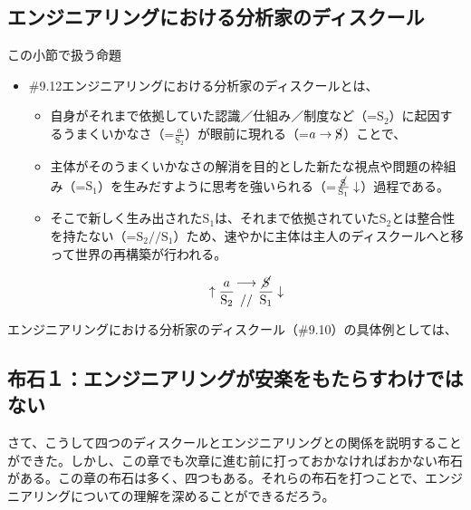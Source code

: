 \subsection{エンジニアリングにおける分析家のディスクール}\label{ux30a8ux30f3ux30b8ux30cbux30a2ux30eaux30f3ux30b0ux306bux304aux3051ux308bux5206ux6790ux5bb6ux306eux30c7ux30a3ux30b9ux30afux30fcux30eb}

\begin{note}{}{この小節で扱う命題}
  \begin{itemize}
    \tightlist
    \item{\#9.12}エンジニアリングにおける分析家のディスクールとは、
      \begin{itemize}
        \tightlist
        \item 自身がそれまで依拠していた認識／仕組み／制度など（=$\textrm{S}_2$）に起因するうまくいかなさ（=$\frac{a}{\textrm{S}_2}$）が眼前に現れる（=$a\rightarrow\cancel{\textrm{S}}$）ことで、
        \item 主体がそのうまくいかなさの解消を目的とした新たな視点や問題の枠組み（=$\textrm{S}_1$）を生みだすように思考を強いられる（=$\frac{\cancel{\textrm{S}}}{\textrm{S}_1}\downarrow$）過程である。
        \item そこで新しく生み出された$\textrm{S}_1$は、それまで依拠されていた$\textrm{S}_2$とは整合性を持たない（=$\textrm{S}_2//\textrm{S}_1$）ため、速やかに主体は主人のディスクールへと移って世界の再構築が行われる。
      \end{itemize}

$$
\uparrow\frac{a}{\mathrm{S_2}}\genfrac{}{}{0pt}{}{\longrightarrow}{//}\frac{\mathrm{\cancel{S}}}{\mathrm{S_1}}\downarrow
$$
  \end{itemize}
\end{note}

エンジニアリングにおける分析家のディスクール（\#9.10）の具体例としては、

\subsection{布石１：エンジニアリングが安楽をもたらすわけではない}\label{ux5e03ux77f3uxff11ux30a8ux30f3ux30b8ux30cbux30a2ux30eaux30f3ux30b0ux304cux5b89ux697dux3092ux3082ux305fux3089ux3059ux308fux3051ux3067ux306fux306aux3044}

さて、こうして四つのディスクールとエンジニアリングとの関係を説明することができた。しかし、この章でも次章に進む前に打っておかなければおかない布石がある。この章の布石は多く、四つもある。それらの布石を打つことで、エンジニアリングについての理解を深めることができるだろう。


